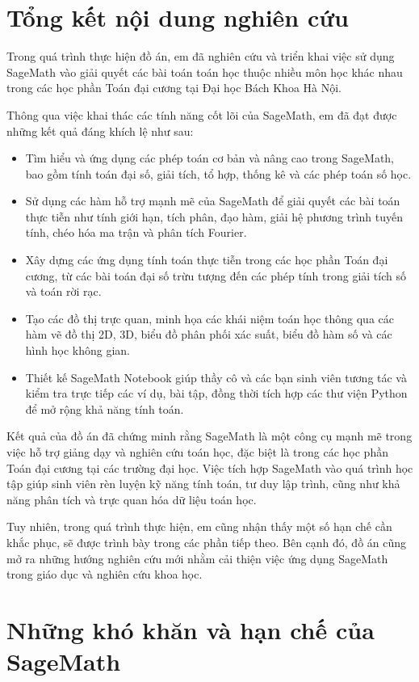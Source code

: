\section{Tổng kết nội dung nghiên cứu}

Trong quá trình thực hiện đồ án, em đã nghiên cứu và triển khai việc sử dụng SageMath vào giải quyết các bài toán toán học thuộc nhiều môn học khác nhau trong các học phần Toán đại cương tại Đại học Bách Khoa Hà Nội. 

Thông qua việc khai thác các tính năng cốt lõi của SageMath, em đã đạt được những kết quả đáng khích lệ như sau:
\begin{itemize}
	\item Tìm hiểu và ứng dụng các phép toán cơ bản và nâng cao trong SageMath, bao gồm tính toán đại số, giải tích, tổ hợp, thống kê và các phép toán số học.
	\item Sử dụng các hàm hỗ trợ mạnh mẽ của SageMath để giải quyết các bài toán thực tiễn như tính giới hạn, tích phân, đạo hàm, giải hệ phương trình tuyến tính, chéo hóa ma trận và phân tích Fourier.
	\item Xây dựng các ứng dụng tính toán thực tiễn trong các học phần Toán đại cương, từ các bài toán đại số trừu tượng đến các phép tính trong giải tích số và toán rời rạc.
	\item Tạo các đồ thị trực quan, minh họa các khái niệm toán học thông qua các hàm vẽ đồ thị 2D, 3D, biểu đồ phân phối xác suất, biểu đồ hàm số và các hình học không gian.
	\item Thiết kế SageMath Notebook giúp thầy cô và các bạn sinh viên tương tác và kiểm tra trực tiếp các ví dụ, bài tập, đồng thời tích hợp các thư viện Python để mở rộng khả năng tính toán.
\end{itemize}

Kết quả của đồ án đã chứng minh rằng SageMath là một công cụ mạnh mẽ trong việc hỗ trợ giảng dạy và nghiên cứu toán học, đặc biệt là trong các học phần Toán đại cương tại các trường đại học. Việc tích hợp SageMath vào quá trình học tập giúp sinh viên rèn luyện kỹ năng tính toán, tư duy lập trình, cũng như khả năng phân tích và trực quan hóa dữ liệu toán học.

Tuy nhiên, trong quá trình thực hiện, em cũng nhận thấy một số hạn chế cần khắc phục, sẽ được trình bày trong các phần tiếp theo. Bên cạnh đó, đồ án cũng mở ra những hướng nghiên cứu mới nhằm cải thiện việc ứng dụng SageMath trong giáo dục và nghiên cứu khoa học.

\section{Những khó khăn và hạn chế của SageMath}

